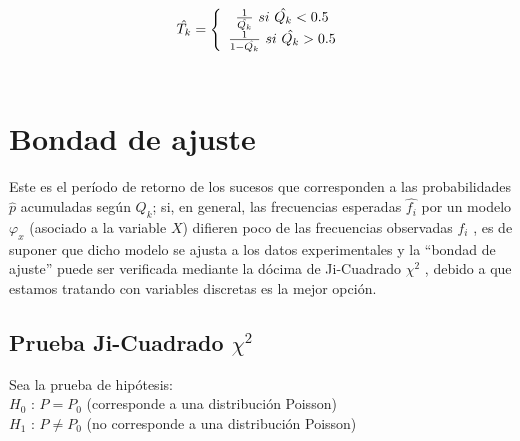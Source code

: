 \begin{equation}
\hat{T_k}=\left\lbrace\begin{array}{c} 
{1 \over \hat{Q_k}}~si~\hat{Q_k} < 0.5 \\ 
{1 \over{1 - \hat{Q_k}}}~si~\hat{Q_k} > 0.5 
\end{array}\right.
\end{equation}
\\


\section{Bondad de ajuste}

Este es el período de retorno de los sucesos que corresponden a las probabilidades $\hat{p}$ acumuladas según $Q_k$; si, en general, las frecuencias esperadas $\hat{f_i}$ por un modelo $\varphi_x$ (asociado a la variable $X$) difieren poco de las frecuencias observadas $f_i$ , es de suponer que dicho modelo se ajusta a los datos experimentales y la ``bondad de ajuste'' puede ser verificada mediante la dócima de Ji-Cuadrado $\chi^{2}$ \cite{DK10}, debido a que estamos tratando con variables discretas es la mejor opción.\\  %

\subsection{Prueba Ji-Cuadrado $\chi^{2}$}

Sea la prueba de hipótesis:\\

$H_0$ : $P = P_0$ (corresponde a una distribución Poisson)\\

$H_1$ : $P\not= P_0$ (no corresponde a una distribución Poisson)\\

